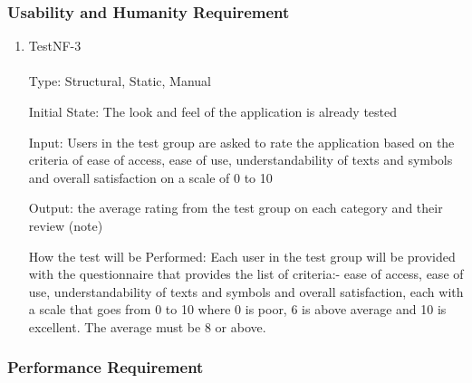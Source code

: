 \documentclass[12pt, titlepage]{article}
\begin{document}
\subsubsection{Usability and Humanity Requirement}


\begin{enumerate}

\item{TestNF-3\\\\}
Type: Structural, Static, Manual

Initial State: The look and feel of the application is already tested

Input: Users in the test group are asked to rate the application based on the criteria of ease of access, ease of use, understandability of texts and symbols and overall satisfaction on a scale of 0 to 10  

Output: the average rating from the test group on each category and their review (note)

How the test will be Performed: Each user in the test group will be provided with the questionnaire that provides the list of criteria:- ease of access, ease of use, understandability of texts and symbols and overall satisfaction, each with a scale that goes from 0 to 10 where 0 is poor, 6 is above average and 10 is excellent. The average must be 8 or above.
\end{enumerate}

\subsubsection{Performance Requirement}
		
\end{document}
